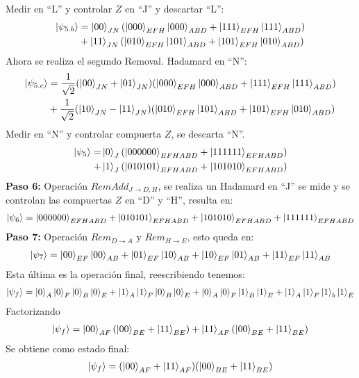 Medir en ``L'' y controlar $Z$ en ``J'' y descartar ``L'':
\begin{align*}
\ket{\psi_{5.b}} & = \ket{00}_{JN}(\ket{000}_{EFH}\ket{000}_{ABD}+\ket{111}_{EFH} \ket{111}_{ABD}) \\
& + \ket{11}_{JN}(\ket{010}_{EFH}\ket{101}_{ABD}+\ket{101}_{EFH} \ket{010}_{ABD})
\end{align*}
Ahora se realiza el segundo Removal. Hadamard en ``N'':
\begin{align*}
\ket{\psi_{5.c}} &= \dfrac{1}{\sqrt{2}} (\ket{00}_{JN}+\ket{01}_{JN})(\ket{000}_{EFH}\ket{000}_{ABD}+\ket{111}_{EFH} \ket{111}_{ABD}) \\
&+ \dfrac{1}{\sqrt{2}} (\ket{10}_{JN}-\ket{11}_{JN})(\ket{010}_{EFH}\ket{101}_{ABD}+\ket{101}_{EFH} \ket{010}_{ABD})
\end{align*}
Medir en ``N'' y controlar compuerta $Z$, se descarta ``N''.
\begin{align*}
\ket{\psi_5} = & \ket{0}_{J}(\ket{000000}_{EFHABD}+\ket{111111}_{EFHABD}) \\
+ & \ket{1}_{J}(\ket{010101}_{EFHABD}+\ket{101010}_{EFHABD})
\end{align*}
\textbf{Paso 6:} Operación $RemAdd_{J \rightarrow D,H}$, se realiza un Hadamard en ``J'' se mide y se controlan las compuertas $Z$ en ``D'' y ``H'', resulta en:
\begin{align*}
\ket{\psi_6} = \ket{000000}_{EFHABD}+\ket{010101}_{EFHABD}+\ket{101010}_{EFHABD}+\ket{111111}_{EFHABD} 
\end{align*}
\textbf{Paso 7:} Operación  $ Rem_{D \rightarrow A} $ y  $ Rem_{H \rightarrow E} $, esto queda en:
\begin{align*}
\ket{\psi_7} = \ket{00}_{EF} \ket{00}_{AB} + \ket{01}_{EF} \ket{10}_{AB} + \ket{10}_{EF} \ket{01}_{AB} + \ket{11}_{EF} \ket{11}_{AB} 
\end{align*}
Esta última es la operación final, reescribiendo tenemos:
\begin{align*}
\ket{\psi_{f}} = \ket{0}_{A} \ket{0}_{F} \ket{0}_{B}\ket{0}_{E} + \ket{1}_{A}\ket{1}_{F}\ket{0}_{B}\ket{0}_{E}+\ket{0}_{A}\ket{0}_{F}\ket{1}_{B}\ket{1}_{E}+\ket{1}_{A}\ket{1}_{F}\ket{1}_{b}\ket{1}_{E}
\end{align*}
Factorizando
\begin{align*}
\ket{\psi_{f}} = \ket{00}_{AF}  (\ket{00}_{BE}+\ket{11}_{BE}) + \ket{11}_{AF}(\ket{00}_{BE}+\ket{11}_{BE})
\end{align*}
Se obtiene como estado final:
\begin{align*}
\ket{\psi_f} = (\ket{00}_{AF}+\ket{11}_{AF})(\ket{00}_{BE}+\ket{11}_{BE})
\end{align*}

